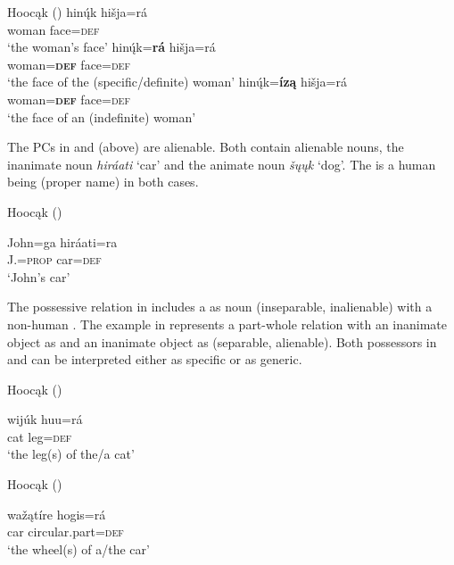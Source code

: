 \documentclass[output=paper]{LSP/langsci}
\begin{document}
\ea {}Hoocąk (\citealt[13]{Helmbrecht2003})\label{womansface}
\ea \label{womansfacea}
\gll hinų́k    hišja=rá \\
woman face=\textsc{def} \\
\glt `the woman's face'
\ex\label{womansfaceb}
\gll hinų́k=\textbf{rá}         hišja=rá \\
woman=\textbf{\textsc{def}} face=\textsc{def} \\
\trans `the face of the (specific/definite) woman'
\ex\label{womansfacec}
\gll hinų́k=\textbf{íz\k{a}} hišja=rá \\
woman=\textbf{\textsc{def}}  face=\textsc{def} \\ 
\glt `the face of an (indefinite) woman'
\z
\z

The PCs in  and  (above) are alienable. Both contain alienable  nouns, the inanimate noun \textit{hiráati} `car' and the animate noun \textit{šųųk} `dog'. The  is a human being (proper name) in both cases. 

\ea {}Hoocąk (\citealt[13]{Helmbrecht2003}) \label{johnscar}

\gll John=ga      hiráati=ra \\
J.=\textsc{prop} car=\textsc{def} \\
\glt `John's car'
\z

The possessive relation in  includes a  as  noun (inseparable, inalienable) with a non-human . The example in  represents a part-whole relation with an inanimate object as  and an inanimate object as  (separable, alienable). Both possessors in  and  can be interpreted either as specific or as generic. 

\ea {}Hoocąk (\citealt[13]{Helmbrecht2003}) \label{leg}

\gll wijúk huu=rá \\
cat      leg=\textsc{def} \\
\glt `the leg(s) of the/a cat'
\z

\ea {}Hoocąk (\citealt[13]{Helmbrecht2003}) \label{wheel}

\gll waž\k{a}tíre hogis=rá \\
car  circular.part=\textsc{def} \\
\glt `the wheel(s) of a/the car'
\z
\end{document}
